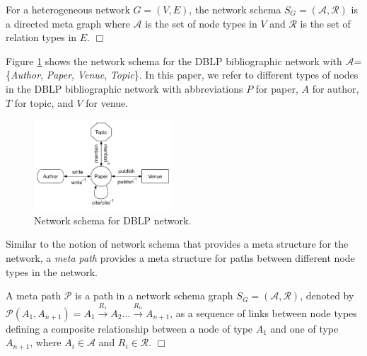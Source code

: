 \begin{definition}For a heterogeneous network $G=(V,E)$, the network schema $S_G=\mathcal{(A,R)}$ is a directed meta graph where $\mathcal{A}$ is the set of node types in $V$ and $\mathcal{R}$ is the set of relation types in $E$.  $\Box$\end{definition}

Figure \ref{schema} shows the network schema for the DBLP bibliographic network with $\mathcal{A}$=\{\textit{Author}, \textit{Paper}, \textit{Venue}, \textit{Topic}\}. In this paper, we refer to different types of nodes in the DBLP bibliographic network with abbreviations $P$ for paper, $A$ for author, $T$ for topic, and $V$ for venue. 

\begin{figure}[t]
\centering
\includegraphics[trim = 0mm 10mm 0mm 0mm,width=0.46\textwidth]{figs/schema.pdf}
\caption{Network schema for DBLP network.}\label{schema}
\end{figure}


Similar to the notion of network schema that provides a meta structure for the network, a \textit{meta path} \cite{sun2011pathsim} provides a meta structure for paths between different node types in the network. 

\begin{definition}A meta path $\mathcal{P}$ is a path in a network schema graph $S_G = (\mathcal{A,R})$, denoted by $\mathcal{P}(A_1,A_{n+1}) = A_1 \xrightarrow{R_1} A_2... \xrightarrow{R_n} A_{n+1}$, as a sequence of links between node types defining a composite relationship between a node of type $A_1$ and one of type $A_{n+1}$, where $A_i \in \mathcal{A}$ and $R_i \in \mathcal{R}$. $\Box$\end{definition}

